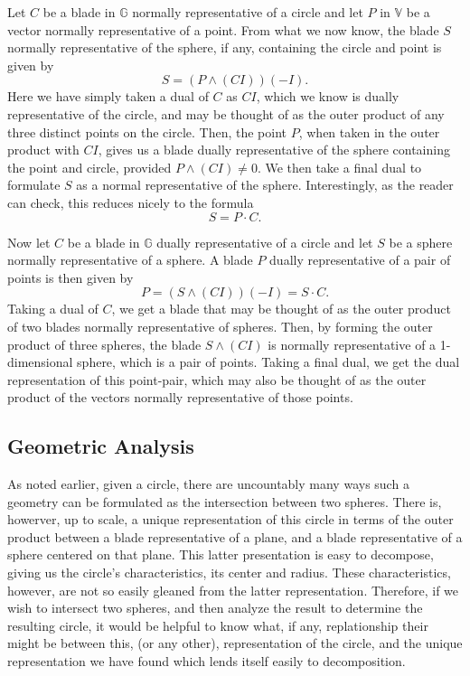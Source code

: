 \documentclass{article}
\newcommand{\V}{\mathbb{V}}
\newcommand{\G}{\mathbb{G}}
\begin{document}
Let $C$ be a blade in $\G$ normally representative of a circle and
let $P$ in $\V$ be a vector normally representative of a point.
From what we now know, the blade $S$ normally representative
of the sphere, if any, containing the circle and point is given by
\begin{equation*}
S = (P\wedge(CI))(-I).
\end{equation*}
Here we have simply taken a dual of $C$ as $CI$, which we know is
dually representative of the circle, and may be thought of as the
outer product of any three distinct points on the circle.  Then, the
point $P$, when taken in the outer product with $CI$, gives us a
blade dually representative of the sphere containing the point and
circle, provided $P\wedge(CI)\neq 0$.  We then take a final dual
to formulate $S$ as a normal representative of the sphere.
Interestingly, as the reader can check, this reduces nicely to
the formula
\begin{equation*}
S = P\cdot C.
\end{equation*}

Now let $C$ be a blade in $\G$ dually representative of a circle and
let $S$ be a sphere normally representative of a sphere.
A blade $P$ dually representative of a pair of points is then
given by
\begin{equation*}
P = (S\wedge(CI))(-I) = S\cdot C.
\end{equation*}
Taking a dual of $C$, we get a blade that may be thought of as
the outer product of two blades normally representative of spheres.
Then, by forming the outer product of three spheres, the blade
$S\wedge(CI)$ is normally representative of a 1-dimensional sphere,
which is a pair of points.  Taking a final dual, we get the
dual representation of this point-pair, which may also be
thought of as the outer product of the vectors normally representative
of those points.

\subsection{Geometric Analysis}

As noted earlier, given a circle, there are uncountably many ways such a geometry
can be formulated as the intersection between two spheres.  There is, howerver, up to scale,
a unique representation of this circle in terms of the outer product between a blade
representative of a plane, and a blade representative of a sphere centered on that plane.
This latter presentation is easy to decompose, giving us the circle's characteristics,
its center and radius.  These characteristics, however, are not so easily gleaned from
the latter representation.  Therefore, if we wish to intersect two spheres, and then
analyze the result to determine the resulting circle, it would be helpful to know
what, if any, replationship their might be between this, (or any other), representation
of the circle, and the unique representation we have found which
lends itself easily to decomposition.
\end{document}
